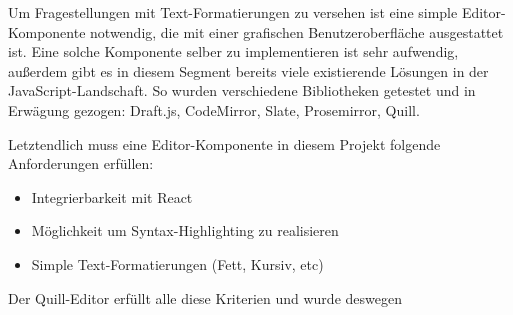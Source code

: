 Um Fragestellungen mit Text-Formatierungen zu versehen ist eine simple Editor-Komponente notwendig, die mit einer grafischen Benutzeroberfläche ausgestattet ist. Eine solche Komponente selber zu implementieren ist sehr aufwendig, außerdem gibt es in diesem Segment bereits viele existierende Lösungen in der JavaScript-Landschaft. So wurden verschiedene Bibliotheken getestet und in Erwägung gezogen: Draft.js, CodeMirror, Slate, Prosemirror, Quill.

Letztendlich muss eine Editor-Komponente in diesem Projekt folgende Anforderungen erfüllen:

\begin{itemize}
    \item Integrierbarkeit mit React
    \item Möglichkeit um Syntax-Highlighting zu realisieren
    \item Simple Text-Formatierungen (Fett, Kursiv, etc)
\end{itemize}

Der Quill-Editor erfüllt alle diese Kriterien und wurde deswegen